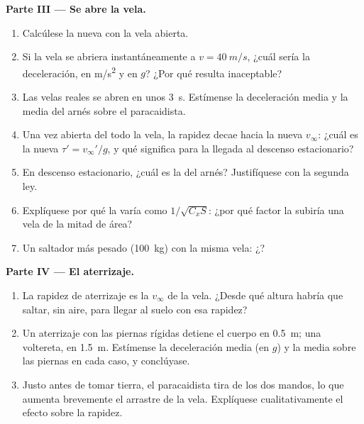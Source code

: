 \begin{problem}
\medskip
\noindent\textbf{Parte III --- Se abre la vela.}
\begin{enumerate}[resume]
  \item Calcúlese la nueva  con la vela abierta.
  \item Si la vela se abriera instantáneamente a $v = \qty{40}{m/s}$,
        ¿cuál sería la deceleración, en \unit{m/s^2} y en $g$? ¿Por qué
        resulta inaceptable?
  \item Las velas reales se abren en unos \qty{3}{s}. Estímense la
        deceleración media y la  media del arnés sobre el
        paracaidista.
  \item Una vez abierta del todo la vela, la rapidez decae hacia la nueva
        $v_\infty$: ¿cuál es la nueva 
        $\tau' = v_\infty'/g$, y qué significa para la llegada al descenso
        estacionario?
  \item En descenso estacionario, ¿cuál es la  del arnés?
        Justifíquese con la segunda ley.
  \item Explíquese por qué la  varía como
        $1/\sqrt{C_xS}$: ¿por qué factor la subiría una vela de la mitad
        de área?
  \item Un saltador más pesado (\qty{100}{kg}) con la misma vela:
        ¿?
\end{enumerate}

\medskip
\noindent\textbf{Parte IV --- El aterrizaje.}
\begin{enumerate}[resume]
  \item La rapidez de aterrizaje es la $v_\infty$ de la vela. ¿Desde qué
        altura habría que saltar, sin aire, para llegar al suelo con esa
        rapidez?
  \item Un aterrizaje con las piernas rígidas detiene el cuerpo en
        \qty{0.5}{m}; una voltereta, en \qty{1.5}{m}. Estímense la
        deceleración media (en $g$) y la  media sobre las piernas en
        cada caso, y conclúyase.
  \item Justo antes de tomar tierra, el paracaidista tira de los dos
        mandos, lo que aumenta brevemente el arrastre de la vela.
        Explíquese cualitativamente el efecto sobre la rapidez.
\end{enumerate}


\end{problem}
